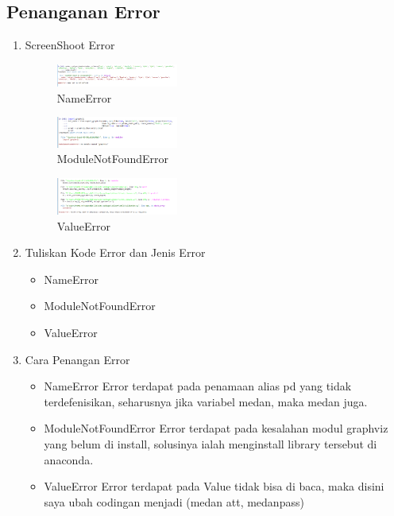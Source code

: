 \subsection{Penanganan Error}
\begin{enumerate}
	\item ScreenShoot Error
	\begin{figure}[H]
		\includegraphics[width=4cm]{figures/1174015/tugas2/error/1.PNG}
		\centering
		\caption{NameError}
	\end{figure}
	\begin{figure}[H]
		\includegraphics[width=4cm]{figures/1174015/tugas2/error/2.PNG}
		\centering
		\caption{ModuleNotFoundError}
	\end{figure}
	\begin{figure}[H]
		\includegraphics[width=4cm]{figures/1174015/tugas2/error/3.PNG}
		\centering
		\caption{ValueError}
	\end{figure}
	\item Tuliskan Kode Error dan Jenis Error
	\begin{itemize}
		\item NameError
		\item ModuleNotFoundError
		\item ValueError
	\end{itemize}
	\item Cara Penangan Error
	\begin{itemize}
		\item NameError
		\hfill\break
		Error terdapat pada penamaan alias pd yang tidak terdefenisikan, seharusnya jika variabel medan, maka medan juga.
		\item ModuleNotFoundError
		\hfill\break
		Error terdapat pada kesalahan modul graphviz yang belum di install, solusinya ialah menginstall library tersebut di anaconda.
		\item ValueError
		\hfill\break
		Error terdapat pada Value tidak bisa di baca, maka disini saya ubah codingan menjadi (medan att, medanpass)
	\end{itemize}
\end{enumerate}
